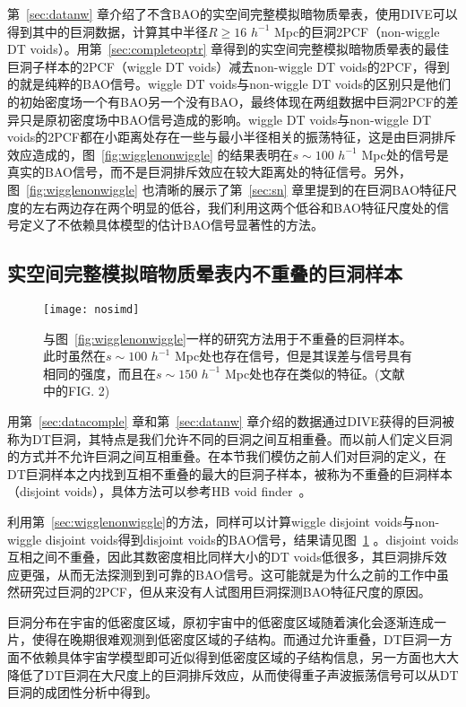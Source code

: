 {第~\ref{sec:datanw} 章介绍了不含BAO的实空间完整模拟暗物质晕表，使用DIVE可以得到其中的巨洞数据，计算其中半径$R \geq 16$ $h^{-1}$ Mpc的巨洞2PCF（non-wiggle DT voids）。用第~\ref{sec:completeoptr} 章得到的实空间完整模拟暗物质晕表的最佳巨洞子样本的2PCF（wiggle DT voids）减去non-wiggle DT voids的2PCF，得到的就是纯粹的BAO信号。wiggle DT voids与non-wiggle DT voids的区别只是他们的初始密度场一个有BAO另一个没有BAO，最终体现在两组数据中巨洞2PCF的差异只是原初密度场中BAO信号造成的影响。wiggle DT voids与non-wiggle DT voids的2PCF都在小距离处存在一些与最小半径相关的振荡特征，这是由巨洞排斥效应造成的，图~\ref{fig:wigglenonwiggle} 的结果表明在$s \sim 100$ $h^{-1}$ Mpc处的信号是真实的BAO信号，而不是巨洞排斥效应在较大距离处的特征信号。另外，图~\ref{fig:wigglenonwiggle} 也清晰的展示了第~\ref{sec:sn} 章里提到的在巨洞BAO特征尺度的左右两边存在两个明显的低谷，我们利用这两个低谷和BAO特征尺度处的信号定义了不依赖具体模型的估计BAO信号显著性的方法。

\subsection{实空间完整模拟暗物质晕表内不重叠的巨洞样本}
\label{sec:disjoint}
\begin{figure}
\centering
\texttt{[image: nosimd]}
\caption{与图~\ref{fig:wigglenonwiggle}一样的研究方法用于不重叠的巨洞样本。此时虽然在$s \sim 100$ $h^{-1}$ Mpc处也存在信号，但是其误差与信号具有相同的强度，而且在$s \sim 150$ $h^{-1}$ Mpc处也存在类似的特征。(文献 ~ 中的FIG. 2)}
\label{fig:disjoint} 
\end{figure}

用第~\ref{sec:datacomple} 章和第~\ref{sec:datanw} 章介绍的数据通过DIVE获得的巨洞被称为DT巨洞，其特点是我们允许不同的巨洞之间互相重叠。而以前人们定义巨洞的方式并不允许巨洞之间互相重叠。在本节我们模仿之前人们对巨洞的定义，在DT巨洞样本之内找到互相不重叠的最大的巨洞子样本，被称为不重叠的巨洞样本（disjoint voids），具体方法可以参考HB void finder~\cite{Patiri2006372}。

利用第~\ref{sec:wigglenonwiggle}的方法，同样可以计算wiggle disjoint voids与non-wiggle disjoint voids得到disjoint voids的BAO信号，结果请见图~\ref{fig:disjoint} 。disjoint voids互相之间不重叠，因此其数密度相比同样大小的DT voids低很多，其巨洞排斥效应更强，从而无法探测到到可靠的BAO信号。这可能就是为什么之前的工作中虽然研究过巨洞的2PCF，但从来没有人试图用巨洞探测BAO特征尺度的原因。

巨洞分布在宇宙的低密度区域，原初宇宙中的低密度区域随着演化会逐渐连成一片，使得在晚期很难观测到低密度区域的子结构。而通过允许重叠，DT巨洞一方面不依赖具体宇宙学模型即可近似得到低密度区域的子结构信息，另一方面也大大降低了DT巨洞在大尺度上的巨洞排斥效应，从而使得重子声波振荡信号可以从DT巨洞的成团性分析中得到。

}
